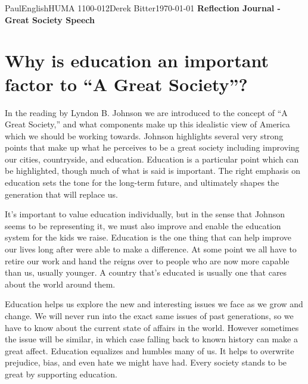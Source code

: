 \documentclass[12pt,letterpaper]{article}
\begin{document}
\begin{mla}{Paul}{English}{HUMA 1100-012}{Derek
    Bitter}{\today}    
    {\textbf{Reflection Journal - Great Society Speech}}

\section*{Why is education an important factor to ``A Great Society''?}

In the reading by Lyndon B. Johnson we are introduced to the concept of ``A Great Society,'' and what components make up this idealistic view of America which we should be working towards. Johnson highlights several very strong points that make up what he perceives to be a great society including improving our cities, countryside, and education. Education is a particular point which can be highlighted, though much of what is said is important. The right emphasis on education sets the tone for the long-term future, and ultimately shapes the generation that will replace us.

It's important to value education individually, but in the sense that Johnson seems to be representing it, we must also improve and enable the education system for the kids we raise. Education is the one thing that can help improve our lives long after were able to make a difference. At some point we all have to retire our work and hand the reigns over to people who are now more capable than us, usually younger. A country that's educated is usually one that cares about the world around them.

Education helps us explore the new and interesting issues we face as we grow and change. We will never run into the exact same issues of past generations, so we have to know about the current state of affairs in the world. However sometimes the issue will be similar, in which case falling back to known history can make a great affect. Education equalizes and humbles many of us. It helps to overwrite prejudice, bias, and even hate we might have had. Every society stands to be great by supporting education.


\end{mla}
\end{document}
